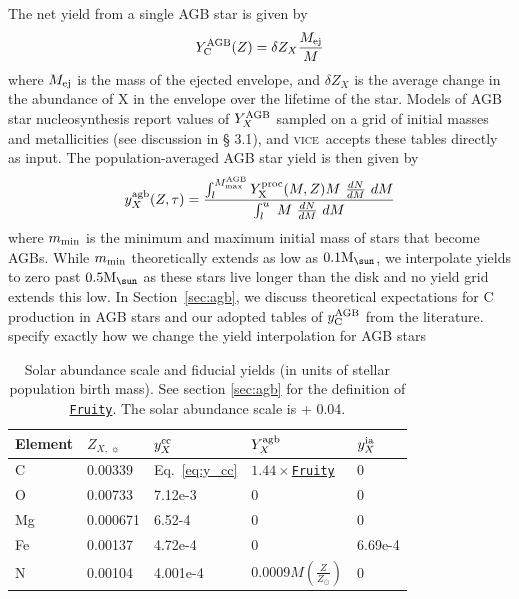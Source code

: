 \documentclass[fleqn,
usenatbib]{mnras}
\newcommand{\VICE}{\textsc{vice}}
\newcommand{\fruity}{\texttt{\hyperlink{fruity}{Fruity}}}
\newcommand{\cfactor}{1.44}
\newcommand{\Ycagb}{{y_{\rm C}^{\rm AGB}}}
\newcommand{\y}{Y}
\newcommand{\Mo}{ {\rm M}_{\sun}}
\newcommand{\dbadd}[1]{{\color{Thistle} #1}}
\begin{document}
The net yield from a single AGB star is given by \begin{equation} \label{eq:net-yield}
   Y_{\rm C}^{\rm AGB}(Z) = 
    \delta Z_X \frac{M_{\rm ej}}{M}
\end{equation}
where $M_{\rm ej}$ is the mass of the ejected envelope, and $\delta Z_X$ is the average change in the abundance of X in the envelope over the lifetime of the star. Models of AGB star nucleosynthesis report values of $Y_X^{\rm AGB}$ sampled on a grid of initial masses and metallicities (see discussion in \S \dbadd{3.1}), and \VICE\ accepts these tables directly as input. The population-averaged AGB star yield is then given by 
\begin{equation} \label{eq:imf-agb-yield}
    y_{X}^{\rm agb}(Z,\tau) = 
    \frac{
    \int_{l}^{M_{\rm max}^{\rm AGB}} 
    \y_{\rm X}^{\rm proc}(M, Z) M\ 
    \frac{dN}{dM}\ dM
}
{
    \int_{l}^{u}\ M\ \frac{dN}{dM}\ dM
}
\end{equation}
where $m_{\rm min}$ is the minimum and maximum initial mass of stars that become AGBs. While $m_{\rm min}$ theoretically extends as low as $0.1 \Mo$, we interpolate yields to zero past $0.5 \Mo$ as these stars live longer than the disk and no yield grid extends this low. In Section~\ref{sec:agb},  we discuss theoretical expectations for C production in AGB stars and our adopted tables of $\Ycagb$ from the literature.
\dbadd{specify exactly how we change the yield interpolation for AGB stars}



\begin{table}
	\centering
    \caption[]{Solar abundance scale and fiducial yields (in units of stellar population birth mass). See section \ref{sec:agb} for the definition of \fruity. The solar abundance scale is \citet{magg+22} + 0.04. }
	\label{tab:fiducial_mod}

	\begin{tabular}{l l l l l}
		\hline
        Element & $Z_{X,\,\sun}$ & $y_X^{\rm cc}$ & $\y_X^{\rm agb}$ & $y_X^{\rm ia}$  \\
		\hline
        C & 0.00339 & Eq.~\ref{eq:y_cc} & $\cfactor\times$\fruity &  0 \\
        O & 0.00733 & 7.12e-3 & 0 & 0 \\
        Mg & 0.000671 & 6.52-4 & 0 & 0 \\
        Fe & 0.00137 & 4.72e-4 & 0 & 6.69e-4 \\
        N &0.00104 & 4.001e-4 & 0.0009$M\left(\frac{Z}{Z_\odot}\right)$ & 0\\
		\hline
	\end{tabular}
\end{table}
\end{document}
